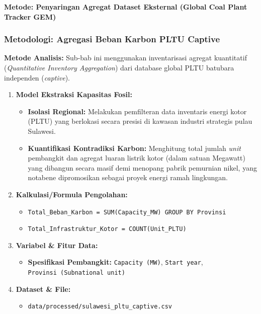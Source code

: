 \documentclass[
]{article}
\providecommand{\tightlist}{%
  \setlength{\itemsep}{0pt}\setlength{\parskip}{0pt}}
\begin{document}
\textbf{Metode: Penyaringan Agregat Dataset Eksternal (Global Coal Plant
Tracker GEM)}

\subsubsection{Metodologi: Agregasi Beban Karbon PLTU
Captive}\label{metodologi-agregasi-beban-karbon-pltu-captive}

\textbf{Metode Analisis:} Sub-bab ini menggunakan inventarisasi agregat
kuantitatif (\emph{Quantitative Inventory Aggregation}) dari database
global PLTU batubara independen (\emph{captive}).

\begin{enumerate}
\def\labelenumi{\arabic{enumi}.}
\tightlist
\item
  \textbf{Model Ekstraksi Kapasitas Fosil:}

  \begin{itemize}
  \tightlist
  \item
    \textbf{Isolasi Regional:} Melakukan pemfilteran data inventaris
    energi kotor (PLTU) yang berlokasi secara presisi di kawasan
    industri strategis pulau Sulawesi.
  \item
    \textbf{Kuantifikasi Kontradiksi Karbon:} Menghitung total jumlah
    \emph{unit} pembangkit dan agregat luaran listrik kotor (dalam
    satuan Megawatt) yang dibangun secara masif demi menopang pabrik
    pemurnian nikel, yang notabene dipromosikan sebagai proyek energi
    ramah lingkungan.
  \end{itemize}
\item
  \textbf{Kalkulasi/Formula Pengolahan:}

  \begin{itemize}
  \tightlist
  \item
    \texttt{Total\_Beban\_Karbon\ =\ SUM(Capacity\_MW)\ GROUP\ BY\ Provinsi}
  \item
    \texttt{Total\_Infrastruktur\_Kotor\ =\ COUNT(Unit\_PLTU)}
  \end{itemize}
\item
  \textbf{Variabel \& Fitur Data:}

  \begin{itemize}
  \tightlist
  \item
    \textbf{Spesifikasi Pembangkit:} \texttt{Capacity\ (MW)},
    \texttt{Start\ year}, \texttt{Provinsi\ (Subnational\ unit)}
  \end{itemize}
\item
  \textbf{Dataset \& File:}

  \begin{itemize}
  \tightlist
  \item
    \texttt{data/processed/sulawesi\_pltu\_captive.csv}
  \end{itemize}
\end{enumerate}
\end{document}
